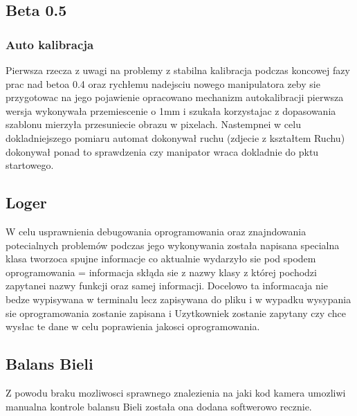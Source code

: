 \documentclass[11pt,a4paper]{article}
\begin{document}
    \subsection{Beta 0.5}

    \subsubsection{Auto kalibracja}
    \hspace{1cm} Pierwsza rzecza z uwagi na problemy z stabilna kalibracja podczas koncowej fazy prac nad betoa 0.4 oraz rychłemu nadejsciu nowego manipulatora zeby sie przygotowac na jego pojawienie opracowano mechanizm autokalibracji pierwsza wersja wykonywała przemiescenie o 1mm i szukała korzystajac z dopasowania szablonu mierzyła przesuniecie obrazu w pixelach. Nastempnei w celu dokladniejszego pomiaru automat dokonywał ruchu (zdjecie z kształtem Ruchu) dokonywał ponad to sprawdzenia czy manipator wraca dokladnie do pktu startowego.

    \subsection{Loger}
    \hspace{1cm} W celu usprawnienia debugowania oprogramowania oraz znajndowania potecialnych problemów podczas jego wykonywania została napisana specialna klasa tworzoca spujne informacje co aktualnie wydarzyło sie pod spodem oprogramowania = informacja skłąda sie z nazwy klasy z której pochodzi zapytanei nazwy funkcji oraz samej informacji. Docelowo ta informacaja nie bedze wypisywana w terminalu lecz zapisywana do pliku i w wypadku wysypania sie oprogramowania zostanie zapisana i Uzytkowniek zostanie zapytany czy chce wysłac te dane w celu poprawienia jakosci oprogramowania.

    \subsection{Balans Bieli}
    \hspace{1cm} Z powodu braku mozliwosci sprawnego znalezienia na jaki kod kamera umozliwi manualna kontrole balansu Bieli została ona dodana softwerowo recznie.
\end{document}

